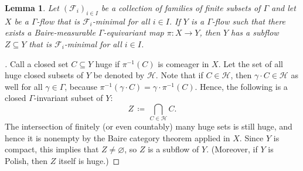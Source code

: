 \documentclass[11pt,reqno,psamsfonts]{amsart}
\theoremstyle{bfnote}
\newtheorem{lemma}[theo]{Lemma}
\theoremstyle{definition}
\theoremstyle{remark}
\newcommand{\0}{\varnothing}
\newcommand{\defeq}{\coloneqq}
\newcommand{\emphd}[1]{{\fontseries{b}\selectfont\textsf{#1}}}
\newcommand{\G}{\Gamma}
\newcommand{\N}{\mathbb{N}}
\numberwithin{equation}{section}
\newenvironment{scproof}[1][]{\begin{proof}[\textsc{\upshape{Proof}}#1]}{\end{proof}}
\begin{document}
    \begin{lemma}\label{lemma:transfer}
        Let $(\mathcal{F}_i)_{i \in I}$ be a collection of families of finite subsets of $\G$ and let %
        $X$ be a %
        $\G$-flow that is $\mathcal{F}_i$-minimal for all $i \in I$. If $Y$ is a $\G$-flow such that there exists a Baire-measurable $\G$-equivariant map $\pi \colon X \to Y$, then $Y$ has a subflow $Z \subseteq Y$ that is $\mathcal{F}_i$-minimal for all $i \in I$.
    \end{lemma}
    \begin{scproof}
        Call a closed set $C \subseteq Y$ \emphd{huge} if $\pi^{-1}(C)$ is comeager in $X$. Let the set of all huge closed subsets of $Y$ be denoted by $\mathcal{H}$. Note that if $C \in \mathcal{H}$, then $\gamma \cdot C \in \mathcal{H}$ as well for all $\gamma \in \G$, because
        $
            \pi^{-1}(\gamma \cdot C) = \gamma \cdot \pi^{-1}(C)
        $. Hence, the following is a closed $\G$-invariant subset of $Y$: %
        \[
            Z \,\defeq\, \bigcap_{C \in \mathcal{H}} C.
        \]
        The intersection of finitely (or even countably) many huge sets is still huge, and hence it is nonempty by the Baire category theorem applied in $X$. Since $Y$ is compact, this implies that $Z \neq \0$, so $Z$ is a subflow of $Y$. (Moreover, if $Y$ is Polish, then $Z$ itself is huge.) 
        
        

\end{scproof}
\end{document}
